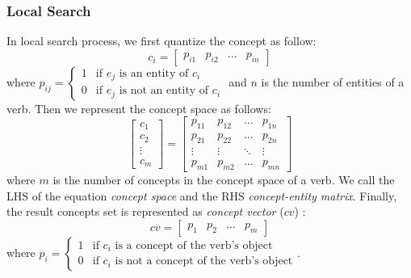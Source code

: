 
\subsubsection{Local Search}

In local search process, we first quantize the concept as follow:
$$
c_i =
\left[
\begin{array}{cccc}
p_{i1} & p_{i2} & \ldots & p_{in}
\end{array}
\right]
$$
where
$
p_{ij} = \left\{ \begin{array}{ll}
1 & \textrm{if $e_j$ is an entity of $c_i$}\\
0 & \textrm{if $e_j$ is not an entity of $c_i$}
\end{array} \right.
$
and $n$ is the number of entities of a verb.
Then we represent the concept space as follows:
$$
\left[
\begin{array}{c}
c_1\\
c_2\\
\vdots\\
c_m
\end{array}
\right]
=
\left[
\begin{array}{cccc}
p_{11} & p_{12} & \dots & p_{1n}\\
p_{21} & p_{22} & \dots & p_{2n}\\
\vdots & \vdots & \ddots & \vdots\\
p_{m1} & p_{m2} & \dots & p_{mn}
\end{array}
\right]
$$
where $m$ is the number of concepts in the concept space of a verb. 
We call the LHS of the equation \emph{concept space} and the RHS
\emph{concept-entity matrix}.
Finally, the result concepts set is represented as \emph{concept vector} ($cv$) :
$$
cv
=
\left[
\begin{array}{cccc}
p_{1} & p_{2} & \ldots & p_{m}
\end{array}
\right]
$$
where
$
p_{i} = \left\{ \begin{array}{ll}
1 & \textrm{if $c_i$ is a concept of the verb's object}\\
0 & \textrm{if $c_i$ is not a concept of the verb's object}
\end{array} \right.
$.

